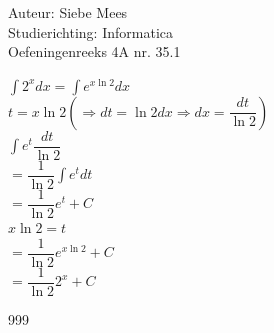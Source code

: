 \documentclass[a4paper]{article}
\begin{document}
  
\noindent \large Auteur: Siebe Mees \\
\noindent \large Studierichting: Informatica\\
\noindent \large Oefeningenreeks 4A nr. 35.1\\

\medskip

\normalsize

$\displaystyle\int 2^x dx = \displaystyle\int e^{x\ln 2} dx$\\

$t=x\ln 2 \left(\Rightarrow dt=\ln 2 dx \Rightarrow dx=\dfrac{dt}{\ln 2}\right)$\\

$\displaystyle\int e^t \dfrac{dt}{\ln 2}$\\

$=\dfrac{1}{\ln 2}\displaystyle\int e^t dt$\\

$=\dfrac{1}{\ln 2}e^t + C$\\

$x \ln 2 = t$\\

$=\dfrac{1}{\ln 2}e^{x\ln 2} + C$\\

$=\dfrac{1}{\ln 2}2^x + C$\\

\begin{thebibliography}{999}
\end{thebibliography}
\end{document}
